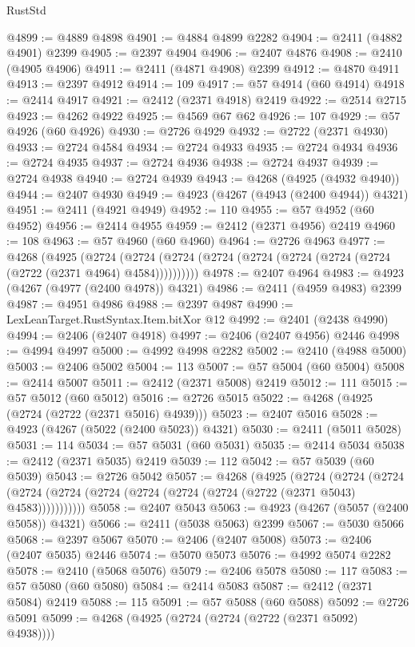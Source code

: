 \begin{lexlean}{RustStd}
\begin{coremodule}
@4899 := @4889 @4898
@4901 := @4884 @4899 @2282
@4904 := @2411 (@4882 @4901) @2399
@4905 := @2397 @4904
@4906 := @2407 @4876
@4908 := @2410 (@4905 @4906)
@4911 := @2411 (@4871 @4908) @2399
@4912 := @4870 @4911
@4913 := @2397 @4912
@4914 := 109
@4917 := @57 @4914 (@60 @4914)
@4918 := @2414 @4917
@4921 := @2412 (@2371 @4918) @2419
@4922 := @2514 @2715
@4923 := @4262 @4922
@4925 := @4569 @67 @62
@4926 := 107
@4929 := @57 @4926 (@60 @4926)
@4930 := @2726 @4929
@4932 := @2722 (@2371 @4930)
@4933 := @2724 @4584
@4934 := @2724 @4933
@4935 := @2724 @4934
@4936 := @2724 @4935
@4937 := @2724 @4936
@4938 := @2724 @4937
@4939 := @2724 @4938
@4940 := @2724 @4939
@4943 := @4268 (@4925 (@4932 @4940))
@4944 := @2407 @4930
@4949 := @4923 (@4267 (@4943 (@2400 @4944)) @4321)
@4951 := @2411 (@4921 @4949)
@4952 := 110
@4955 := @57 @4952 (@60 @4952)
@4956 := @2414 @4955
@4959 := @2412 (@2371 @4956) @2419
@4960 := 108
@4963 := @57 @4960 (@60 @4960)
@4964 := @2726 @4963
@4977 := @4268
    (@4925
      (@2724 (@2724 (@2724 (@2724 (@2724 (@2724 (@2724 (@2724 (@2722 (@2371 @4964) @4584))))))))))
@4978 := @2407 @4964
@4983 := @4923 (@4267 (@4977 (@2400 @4978)) @4321)
@4986 := @2411 (@4959 @4983) @2399
@4987 := @4951 @4986
@4988 := @2397 @4987
@4990 := LexLeanTarget.RustSyntax.Item.bitXor @12
@4992 := @2401 (@2438 @4990)
@4994 := @2406 (@2407 @4918)
@4997 := @2406 (@2407 @4956) @2446
@4998 := @4994 @4997
@5000 := @4992 @4998 @2282
@5002 := @2410 (@4988 @5000)
@5003 := @2406 @5002
@5004 := 113
@5007 := @57 @5004 (@60 @5004)
@5008 := @2414 @5007
@5011 := @2412 (@2371 @5008) @2419
@5012 := 111
@5015 := @57 @5012 (@60 @5012)
@5016 := @2726 @5015
@5022 := @4268 (@4925 (@2724 (@2722 (@2371 @5016) @4939)))
@5023 := @2407 @5016
@5028 := @4923 (@4267 (@5022 (@2400 @5023)) @4321)
@5030 := @2411 (@5011 @5028)
@5031 := 114
@5034 := @57 @5031 (@60 @5031)
@5035 := @2414 @5034
@5038 := @2412 (@2371 @5035) @2419
@5039 := 112
@5042 := @57 @5039 (@60 @5039)
@5043 := @2726 @5042
@5057 := @4268
    (@4925
      (@2724
        (@2724
          (@2724 (@2724 (@2724 (@2724 (@2724 (@2724 (@2724 (@2722 (@2371 @5043) @4583)))))))))))
@5058 := @2407 @5043
@5063 := @4923 (@4267 (@5057 (@2400 @5058)) @4321)
@5066 := @2411 (@5038 @5063) @2399
@5067 := @5030 @5066
@5068 := @2397 @5067
@5070 := @2406 (@2407 @5008)
@5073 := @2406 (@2407 @5035) @2446
@5074 := @5070 @5073
@5076 := @4992 @5074 @2282
@5078 := @2410 (@5068 @5076)
@5079 := @2406 @5078
@5080 := 117
@5083 := @57 @5080 (@60 @5080)
@5084 := @2414 @5083
@5087 := @2412 (@2371 @5084) @2419
@5088 := 115
@5091 := @57 @5088 (@60 @5088)
@5092 := @2726 @5091
@5099 := @4268 (@4925 (@2724 (@2724 (@2722 (@2371 @5092) @4938))))

\end{coremodule}
\end{lexlean}
